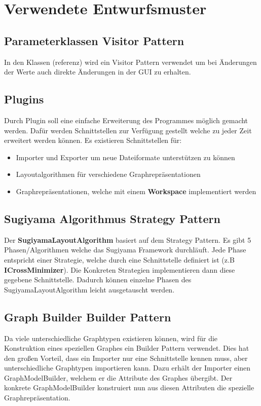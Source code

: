 \chapter{Verwendete Entwurfsmuster}
\label{ch:entwurfsmuster}

\section{Parameterklassen Visitor Pattern}
In den Klassen (referenz) wird ein Visitor Pattern verwendet um bei Änderungen der Werte auch direkte Änderungen in der GUI zu erhalten. %

\section{Plugins}
Durch Plugin soll eine einfache Erweiterung des Programmes möglich gemacht werden. Dafür werden Schnittstellen zur Verfügung gestellt welche zu jeder Zeit erweitert werden können.
Es existieren Schnittstellen für:
\begin{itemize}
  \item Importer und Exporter um neue Dateiformate unterstützen zu können
  \item Layoutalgorithmen für verschiedene Graphrepräsentationen
  \item Graphrepräsentationen, welche mit einem \textbf{Workspace} implementiert werden
\end{itemize}

\section{Sugiyama Algorithmus Strategy Pattern}
Der \textbf{SugiyamaLayoutAlgorithm} basiert auf dem Strategy Pattern. Es gibt 5 Phasen/Algorithmen welche das Sugiyama Framework durchläuft.
Jede Phase entspricht einer Strategie, welche durch eine Schnittstelle definiert ist (z.B \textbf{ICrossMinimizer}).
Die Konkreten Strategien implementieren dann diese gegebene Schnittstelle. Dadurch können einzelne Phasen des SugiyamaLayoutAlgorithm leicht ausgetauscht werden.

\section{Graph Builder Builder Pattern}
Da viele unterschiedliche Graphtypen existieren können, wird für die Konstruktion eines speziellen Graphes ein Builder Pattern verwendet.
Dies hat den großen Vorteil, dass ein Importer nur eine Schnittstelle kennen muss, aber unterschiedliche Graphtypen importieren kann.
Dazu erhält der Importer einen GraphModelBuilder, welchem er die Attribute des Graphes übergibt. Der konkrete GraphModelBuilder konstruiert nun aus diesen Attributen die spezielle Graphrepräsentation.

